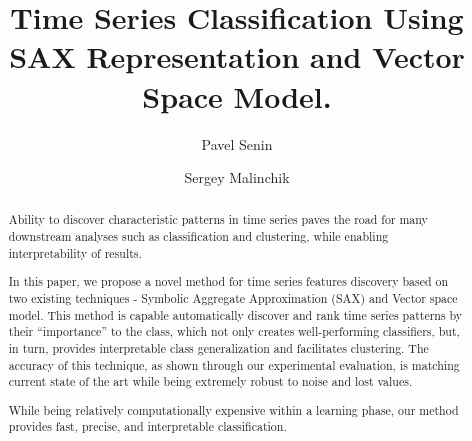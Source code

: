 \documentclass{llncs}
\begin{document}
%
\mainmatter              %
%
\title{Time Series Classification Using SAX Representation and Vector Space Model.}
%
%
\author{Pavel Senin
\and Sergey Malinchik
}
%
%
%


\maketitle              %

\begin{abstract}
Ability to discover characteristic patterns in time series paves the road for many downstream
analyses such as classification and clustering, while enabling interpretability of results. 

In this paper, we propose a novel method for time series features discovery based on two existing
techniques - Symbolic Aggregate Approximation (SAX) and Vector space model. 
This method is capable automatically discover and rank time series patterns by their “importance” to
the class, which not only creates well-performing classifiers, but, in turn, provides interpretable
class generalization and facilitates clustering. The accuracy of this technique, as shown  through
our experimental evaluation, is matching current state of the art while being extremely robust to
noise and lost values.  

While being relatively computationally expensive within a learning phase, our method provides fast,
precise, and interpretable classification.
\end{abstract}
%
\end{document}
